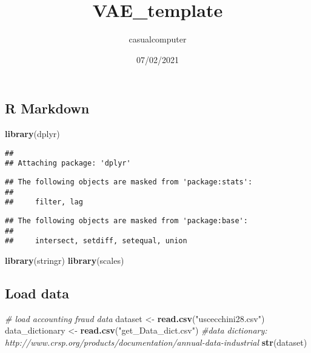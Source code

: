 \documentclass[
]{article}
\title{VAE\_template}
\author{casualcomputer}
\date{07/02/2021}
\newenvironment{Shaded}{\begin{snugshade}}{\end{snugshade}}
\newcommand{\CommentTok}[1]{\textcolor[rgb]{0.56,0.35,0.01}{\textit{#1}}}
\newcommand{\DataTypeTok}[1]{\textcolor[rgb]{0.13,0.29,0.53}{#1}}
\newcommand{\KeywordTok}[1]{\textcolor[rgb]{0.13,0.29,0.53}{\textbf{#1}}}
\newcommand{\NormalTok}[1]{#1}
\newcommand{\OperatorTok}[1]{\textcolor[rgb]{0.81,0.36,0.00}{\textbf{#1}}}
\newcommand{\OtherTok}[1]{\textcolor[rgb]{0.56,0.35,0.01}{#1}}
\newcommand{\StringTok}[1]{\textcolor[rgb]{0.31,0.60,0.02}{#1}}
\begin{document}
\maketitle

\begin{Shaded}
\end{Shaded}

\hypertarget{r-markdown}{%
\subsection{R Markdown}\label{r-markdown}}

\begin{Shaded}
\begin{Highlighting}[]
    \KeywordTok{library}\NormalTok{(dplyr)}
\end{Highlighting}
\end{Shaded}

\begin{verbatim}
## 
## Attaching package: 'dplyr'
\end{verbatim}

\begin{verbatim}
## The following objects are masked from 'package:stats':
## 
##     filter, lag
\end{verbatim}

\begin{verbatim}
## The following objects are masked from 'package:base':
## 
##     intersect, setdiff, setequal, union
\end{verbatim}

\begin{Shaded}
\begin{Highlighting}[]
    \KeywordTok{library}\NormalTok{(stringr)}
    \KeywordTok{library}\NormalTok{(scales)}
\end{Highlighting}
\end{Shaded}

\hypertarget{load-data}{%
\subsection{Load data}\label{load-data}}

\begin{Shaded}
\begin{Highlighting}[]
\CommentTok{# load accounting fraud data     }
\NormalTok{    dataset <-}\StringTok{ }\KeywordTok{read.csv}\NormalTok{(}\StringTok{"uscecchini28.csv"}\NormalTok{)}
\NormalTok{    data_dictionary <-}\StringTok{ }\KeywordTok{read.csv}\NormalTok{(}\StringTok{"get_Data_dict.csv"}\NormalTok{) }\CommentTok{#data dictionary: http://www.crsp.org/products/documentation/annual-data-industrial}
    \KeywordTok{str}\NormalTok{(dataset)}
\end{Highlighting}
\end{Shaded}
\end{document}
